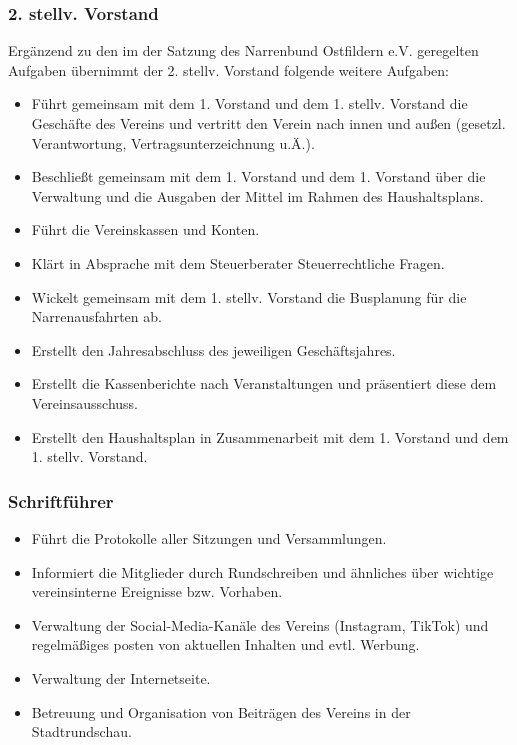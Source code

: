 \subsubsection{2. stellv. Vorstand}
Ergänzend zu den im  der Satzung des Narrenbund Ostfildern e.V. geregelten Aufgaben übernimmt der 2. stellv. Vorstand folgende weitere Aufgaben:
\begin{itemize}
    \item Führt gemeinsam mit dem 1. Vorstand und dem 1. stellv. Vorstand die Geschäfte des Vereins und vertritt den Verein nach innen und außen (gesetzl. Verantwortung, Vertragsunterzeichnung u.Ä.).

    \item Beschließt gemeinsam mit dem 1. Vorstand und dem 1. Vorstand über die Verwaltung und die Ausgaben der Mittel im Rahmen des Haushaltsplans.

    \item Führt die Vereinskassen und Konten.

    \item Klärt in Absprache mit dem Steuerberater Steuerrechtliche Fragen.

    \item Wickelt gemeinsam mit dem 1. stellv. Vorstand die Busplanung für die Narrenausfahrten ab.

    \item Erstellt den Jahresabschluss des jeweiligen Geschäftsjahres.

    \item Erstellt die Kassenberichte nach Veranstaltungen und präsentiert diese dem Vereinsausschuss. 
    
    \item Erstellt den Haushaltsplan in Zusammenarbeit mit dem 1. Vorstand und dem 1. stellv. Vorstand.
\end{itemize}

\subsubsection{Schriftführer}
\begin{itemize}
    \item Führt die Protokolle aller Sitzungen und Versammlungen.

    \item Informiert die Mitglieder durch Rundschreiben und ähnliches über wichtige vereinsinterne Ereignisse bzw. Vorhaben.

    \item Verwaltung der Social-Media-Kanäle des Vereins (Instagram, TikTok) und regelmäßiges posten von aktuellen Inhalten und evtl. Werbung.

    \item Verwaltung der Internetseite.
    
    \item Betreuung und Organisation von Beiträgen des Vereins in der Stadtrundschau.
\end{itemize}


